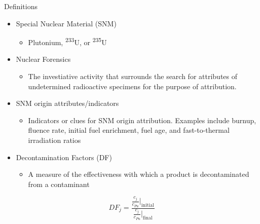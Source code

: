\documentclass{beamer}
\newcommand{\tss}{\textsuperscript}
\begin{document}
\begin{frame}{Definitions}
  \vspace{-0.7cm}
  \begin{itemize}
  \item{Special Nuclear Material (SNM)}
    \begin{itemize}
    \item{Plutonium, \tss{233}U, or \tss{235}U}
    \end{itemize}
  \item{Nuclear Forensics}
    \begin{itemize}
    \item{The investiative activity that surrounds the search for attributes
      of undetermined radioactive specimens for the purpose of attribution.}
    \end{itemize}
  \item{SNM origin attributes/indicators}
    \begin{itemize}
    \item{Indicators or clues for SNM origin attribution. Examples include burnup, fluence rate,
    initial fuel enrichment, fuel age, and fast-to-thermal irradiation ratios}
    \end{itemize}
  \item{Decontamination Factors (DF)}
    \begin{itemize}
    \item{A measure of the effectiveness with which a product is decontaminated from a
      contaminant}
    \end{itemize}
  \end{itemize}
  \vspace{1mm}
    \begin{equation*}
      DF_j=\frac{\frac{c_j}{c_{Pu}}|_{\text{initial}}}{\frac{c_j}{c_{Pu}}|_{\text{final}}}
    \end{equation*}
\end{frame}
\end{document}
